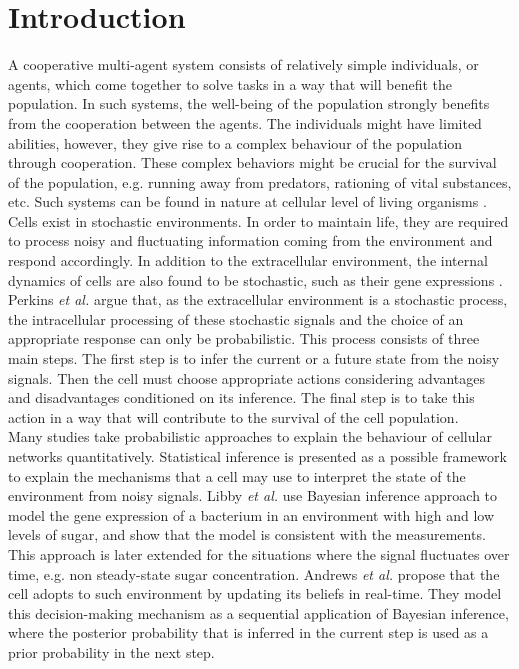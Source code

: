 \chapter{Introduction}
A cooperative multi-agent system consists of relatively simple individuals, or agents, which come together to solve tasks in a way that will benefit the population. In such systems, the well-being of the population strongly benefits from the cooperation between the agents. The individuals might have limited abilities, however, they give rise to a complex behaviour of the population through cooperation. These complex behaviors might be crucial for the survival of the population, e.g. running away from predators, rationing of vital substances, etc. Such systems can be found in nature at cellular level of living organisms \cite{Perkins2009a}. \\
Cells exist in stochastic environments. In order to maintain life, they are required to process noisy and fluctuating information coming from the environment and respond accordingly. In addition to the extracellular environment, the internal dynamics of cells are also found to be stochastic, such as their gene expressions \cite{Shahrezaei2008}. \\
Perkins \textit{et al.} \cite{Perkins2009a} argue that, as the extracellular environment is a stochastic process, the intracellular processing of these stochastic signals and the choice of an appropriate response can only be probabilistic. This process consists of three main steps. The first step is to infer the current or a future state from the noisy signals. Then the cell must choose appropriate actions considering advantages and disadvantages conditioned on its inference. The final step is to take this action in a way that will contribute to the survival of the cell population. \\
Many studies take probabilistic approaches to explain the behaviour of cellular networks quantitatively. Statistical inference is presented as a possible framework to explain the mechanisms that a cell may use to interpret the state of the environment from noisy signals. Libby \textit{et al.} \cite{Libby2007} use Bayesian inference approach to model the gene expression of a bacterium in an environment with high and low levels of sugar, and show that the model is consistent with the measurements. This approach is later extended for the situations where the signal fluctuates over time, e.g. non steady-state sugar concentration. Andrews \textit{et al.} \cite{Andrews2006} propose that the cell adopts to such environment by updating its beliefs in real-time. They model this decision-making mechanism as a sequential application of Bayesian inference, where the posterior probability that is inferred in the current step is used as a prior probability in the next step.\\
